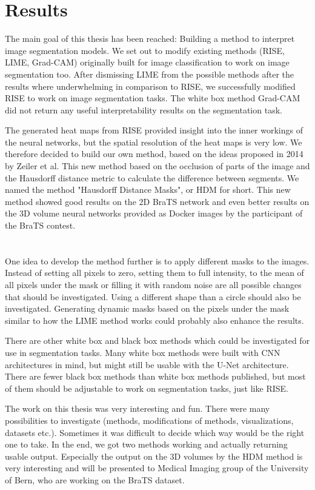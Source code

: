 \section{Results}
The main goal of this thesis has been reached: Building a method to interpret image segmentation models. We set out to modify existing methods (RISE, LIME, Grad-CAM) originally built for image classification to work on image segmentation too. After dismissing LIME from the possible methods after the results where underwhelming in comparison to RISE, we successfully modified RISE to work on image segmentation tasks. The white box method Grad-CAM did not return any useful interpretability results on the segmentation task.

The generated heat maps from RISE provided insight into the inner workings of the neural networks, but the spatial resolution of the heat maps is very low. We therefore decided to build our own method, based on the ideas proposed in 2014 by Zeiler et al. This new method based on the occlusion of parts of the image and the Hausdorff distance metric to calculate the difference between segments. We named the method "Hausdorff Distance Masks", or HDM for short. This new method showed good results on the 2D BraTS network and even better results on the 3D volume neural networks provided as Docker images by the participant of the BraTS contest.

\section{}
One idea to develop the method further is to apply different masks to the images. Instead of setting all pixels to zero, setting them to full intensity, to the mean of all pixels under the mask or filling it with random noise are all possible changes that should be investigated. Using a different shape than a circle should also be investigated. Generating dynamic masks based on the pixels under the mask similar to how the LIME method works could probably also enhance the results.

There are other white box and black box methods which could be investigated for use in segmentation tasks. Many white box methods were built with CNN architectures in mind, but might still be usable with the U-Net architecture. There are fewer black box methods than white box methods published, but most of them should be adjustable to work on segmentation tasks, just like RISE.

The work on this thesis was very interesting and fun. There were many possibilities to investigate (methods, modifications of methods, visualizations, datasets etc.). Sometimes it was difficult to decide which way would be the right one to take. In the end, we got two methods working and actually returning usable output. Especially the output on the 3D volumes by the HDM method is very interesting and will be presented to Medical Imaging group of the University of Bern, who are working on the BraTS dataset.
